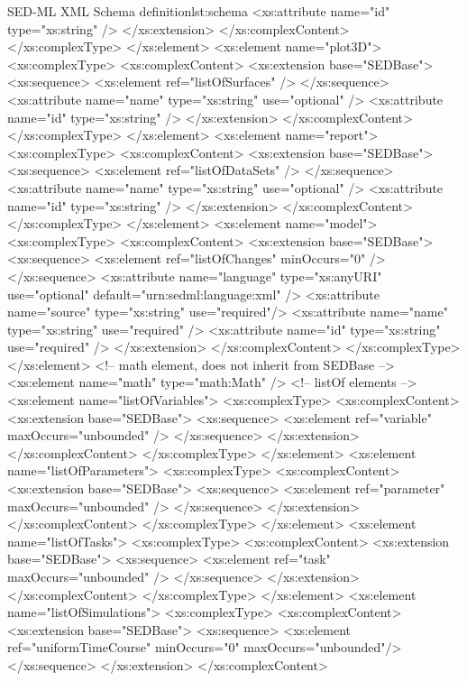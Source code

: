 \begin{myXmlLst}{SED-ML XML Schema definition}{lst:schema}
			<xs:attribute name="id" type="xs:string" />
		</xs:extension>
		</xs:complexContent>
		</xs:complexType>
	</xs:element>
	<xs:element name="plot3D">
		<xs:complexType>
		<xs:complexContent>
		<xs:extension base="SEDBase">
			<xs:sequence>
				<xs:element ref="listOfSurfaces" />
			</xs:sequence>
			<xs:attribute name="name" type="xs:string" use="optional" />
			<xs:attribute name="id" type="xs:string" />
		</xs:extension>
		</xs:complexContent>
		</xs:complexType>
	</xs:element>
	<xs:element name="report">
		<xs:complexType>
		<xs:complexContent>
		<xs:extension base="SEDBase">
			<xs:sequence>
				<xs:element ref="listOfDataSets" />
			</xs:sequence>
			<xs:attribute name="name" type="xs:string" use="optional" />
			<xs:attribute name="id" type="xs:string" />
		</xs:extension>
		</xs:complexContent>
		</xs:complexType>
	</xs:element>
	<xs:element name="model">
		<xs:complexType>
		<xs:complexContent>
		<xs:extension base="SEDBase">
			<xs:sequence>
				<xs:element ref="listOfChanges" minOccurs="0" />
			</xs:sequence>
			<xs:attribute name="language" type="xs:anyURI" use="optional" default="urn:sedml:language:xml" />
			<xs:attribute name="source" type="xs:string" use="required"/>
			<xs:attribute name="name" type="xs:string" use="required" />
			<xs:attribute name="id" type="xs:string" use="required" />
		</xs:extension>
		</xs:complexContent>
		</xs:complexType>
	</xs:element>
<!-- math element, does not inherit from SEDBase -->
	<xs:element name="math" type="math:Math" />
<!-- listOf elements -->
	<xs:element name="listOfVariables">
		<xs:complexType>
		<xs:complexContent>
		<xs:extension base="SEDBase">
			<xs:sequence>
				<xs:element ref="variable" maxOccurs="unbounded" />
			</xs:sequence>
		</xs:extension>
		</xs:complexContent>
		</xs:complexType>
	</xs:element>
	<xs:element name="listOfParameters">
		<xs:complexType>
		<xs:complexContent>
		<xs:extension base="SEDBase">
			<xs:sequence>
				<xs:element ref="parameter" maxOccurs="unbounded" />
			</xs:sequence>
		</xs:extension>
		</xs:complexContent>
		</xs:complexType>
	</xs:element>
	<xs:element name="listOfTasks">
		<xs:complexType>
		<xs:complexContent>
		<xs:extension base="SEDBase">
			<xs:sequence>
				<xs:element ref="task" maxOccurs="unbounded" />
			</xs:sequence>
		</xs:extension>
		</xs:complexContent>
		</xs:complexType>
	</xs:element>
	<xs:element name="listOfSimulations">
		<xs:complexType>
		<xs:complexContent>
		<xs:extension base="SEDBase">
			<xs:sequence>
				<xs:element ref="uniformTimeCourse" minOccurs="0" maxOccurs="unbounded"/>
			</xs:sequence>
		</xs:extension>
		</xs:complexContent>

\end{myXmlLst}
